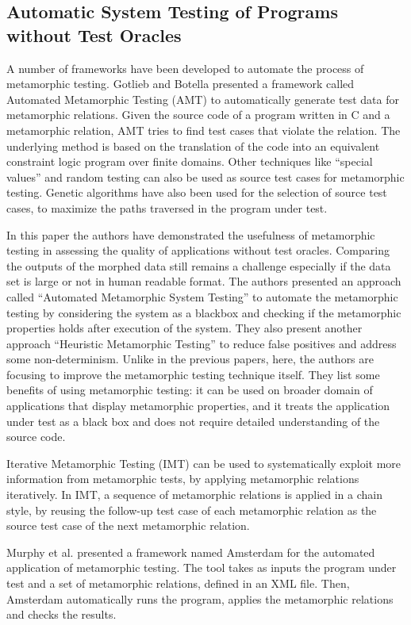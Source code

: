 	\subsection{Automatic System Testing of Programs without Test Oracles \cite{Murphy2009}}
	A number of frameworks have been developed to automate the process of metamorphic testing. Gotlieb and Botella \cite{Gotlieb2003} presented a framework called Automated Metamorphic Testing (AMT) to automatically generate test data for metamorphic relations. Given the source code of a program written in C and a metamorphic relation, AMT tries to find test cases that violate the relation. The underlying method is based on the translation of the code into an equivalent constraint logic program over finite domains. Other techniques like “special values” and random testing can also be used as source test cases for metamorphic testing. Genetic algorithms have also been used for the selection of source test cases, to maximize the paths traversed in the program under test.
	
		In this paper the authors have demonstrated the usefulness of metamorphic testing in assessing the quality of applications without test oracles. Comparing the outputs of the morphed data still remains a challenge especially if the data set is large or not in human readable format. The authors presented an approach called ``Automated Metamorphic System Testing'' to automate the metamorphic testing by considering the system as a blackbox and checking if the metamorphic properties holds after execution of the system. They also present another approach “Heuristic Metamorphic Testing” to reduce false positives and address some non-determinism. Unlike in the previous papers, here, the authors are focusing to improve the metamorphic testing technique itself. They list some benefits of using metamorphic testing: it can be used on broader domain of applications that display metamorphic properties, and it treats the application under test as a black box and does not require detailed understanding of the source code. \cite{Murphy2009}
		
        
		\cite{Segura2016} Iterative Metamorphic Testing (IMT) can be used to systematically exploit more information from metamorphic tests, by applying metamorphic relations iteratively. In IMT, a sequence of metamorphic relations is applied in a chain style, by reusing the follow-up test case of each metamorphic relation as the source test case of the next metamorphic relation. \par
		Murphy et al. \cite{Murphy2009} presented a framework named Amsterdam for the automated application of metamorphic testing. The tool takes as inputs the program under test and a set of metamorphic relations, defined in an XML file. Then, Amsterdam automatically runs the program, applies the metamorphic relations and checks the results.
		
